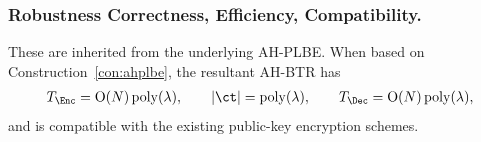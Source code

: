 \subsubsection{Robustness Correctness, Efficiency, Compatibility.}
These are inherited from the underlying AH-PLBE.
When based on Construction~\ref{con:ahplbe},
the resultant AH-BTR has
\begin{align*}
T_\Enc=\bigO(N)\poly(\lambda),\qquad
|\ct|=\poly(\lambda),\qquad
T_\Dec=\bigO(N)\poly(\lambda),
\end{align*}
and is compatible with the existing public-key encryption schemes.
